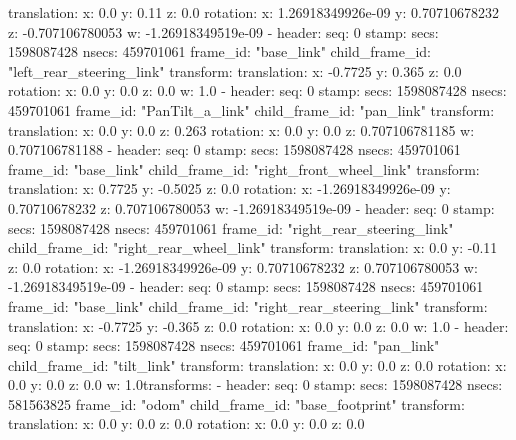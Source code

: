       translation: 
        x: 0.0
        y: 0.11
        z: 0.0
      rotation: 
        x: 1.26918349926e-09
        y: 0.70710678232
        z: -0.707106780053
        w: -1.26918349519e-09
  - 
    header: 
      seq: 0
      stamp: 
        secs: 1598087428
        nsecs: 459701061
      frame_id: "base_link"
    child_frame_id: "left_rear_steering_link"
    transform: 
      translation: 
        x: -0.7725
        y: 0.365
        z: 0.0
      rotation: 
        x: 0.0
        y: 0.0
        z: 0.0
        w: 1.0
  - 
    header: 
      seq: 0
      stamp: 
        secs: 1598087428
        nsecs: 459701061
      frame_id: "PanTilt_a_link"
    child_frame_id: "pan_link"
    transform: 
      translation: 
        x: 0.0
        y: 0.0
        z: 0.263
      rotation: 
        x: 0.0
        y: 0.0
        z: 0.707106781185
        w: 0.707106781188
  - 
    header: 
      seq: 0
      stamp: 
        secs: 1598087428
        nsecs: 459701061
      frame_id: "base_link"
    child_frame_id: "right_front_wheel_link"
    transform: 
      translation: 
        x: 0.7725
        y: -0.5025
        z: 0.0
      rotation: 
        x: -1.26918349926e-09
        y: 0.70710678232
        z: 0.707106780053
        w: -1.26918349519e-09
  - 
    header: 
      seq: 0
      stamp: 
        secs: 1598087428
        nsecs: 459701061
      frame_id: "right_rear_steering_link"
    child_frame_id: "right_rear_wheel_link"
    transform: 
      translation: 
        x: 0.0
        y: -0.11
        z: 0.0
      rotation: 
        x: -1.26918349926e-09
        y: 0.70710678232
        z: 0.707106780053
        w: -1.26918349519e-09
  - 
    header: 
      seq: 0
      stamp: 
        secs: 1598087428
        nsecs: 459701061
      frame_id: "base_link"
    child_frame_id: "right_rear_steering_link"
    transform: 
      translation: 
        x: -0.7725
        y: -0.365
        z: 0.0
      rotation: 
        x: 0.0
        y: 0.0
        z: 0.0
        w: 1.0
  - 
    header: 
      seq: 0
      stamp: 
        secs: 1598087428
        nsecs: 459701061
      frame_id: "pan_link"
    child_frame_id: "tilt_link"
    transform: 
      translation: 
        x: 0.0
        y: 0.0
        z: 0.0
      rotation: 
        x: 0.0
        y: 0.0
        z: 0.0
        w: 1.0transforms: 
  - 
    header: 
      seq: 0
      stamp: 
        secs: 1598087428
        nsecs: 581563825
      frame_id: "odom"
    child_frame_id: "base_footprint"
    transform: 
      translation: 
        x: 0.0
        y: 0.0
        z: 0.0
      rotation: 
        x: 0.0
        y: 0.0
        z: 0.0
